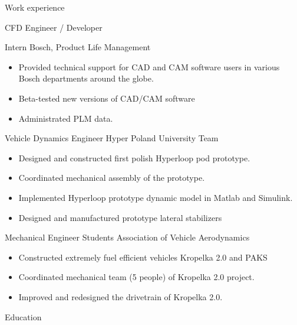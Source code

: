 \documentclass[a4paper, 10pt]{article}
\def \addspace {0.0em}
\begin{document}
{\begin{cvsection}{Work experience}
\begin{entry}{CFD Engineer / Developer}{\hfill {}}
\begin{itemize}
      \end{itemize}
    \end{entry}
    \vspace{\addspace}
    \begin{entry}{Intern}{\hfill {}}
      Bosch, Product Life Management
      \begin{itemize}
        \item Provided technical support for CAD and CAM software users in various Bosch departments around the globe.
        \item Beta-tested new versions of CAD/CAM software
        \item Administrated PLM data.
      \end{itemize}
    \end{entry}
    \vspace{\addspace}
    \begin{entry}{Vehicle Dynamics Engineer}{\hfill {}}
      Hyper Poland University Team
      \begin{itemize}
        \item Designed and constructed first polish Hyperloop pod prototype.
        \item Coordinated mechanical assembly of the prototype.
        \item Implemented Hyperloop prototype dynamic model in Matlab and Simulink.
        \item Designed and manufactured prototype lateral stabilizers
      \end{itemize}
    \end{entry}
    \vspace{\addspace}
    \begin{entry}{Mechanical Engineer}{\hfill {}}
      Students Association of Vehicle Aerodynamics
      \begin{itemize}
        \item Constructed extremely fuel efficient vehicles Kropelka 2.0 and PAKS
        \item Coordinated mechanical team (5 people) of Kropelka 2.0 project.
        \item Improved and redesigned the drivetrain of Kropelka 2.0.
      \end{itemize}
    \end{entry}
  \end{cvsection}
}{%
  \begin{cvsection}{Education}

\end{cvsection}}
\end{document}
